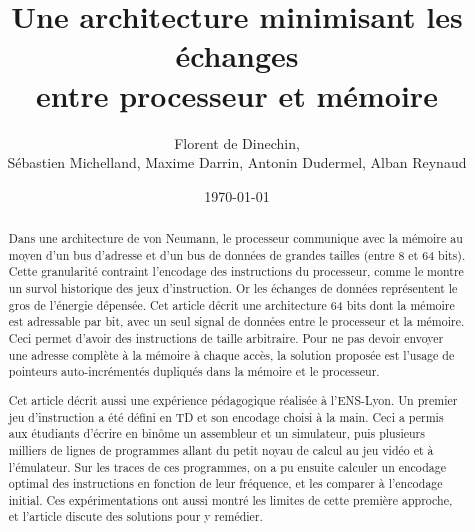 \documentclass[architecture]{compas2018}
\begin{document}
\title{Une architecture minimisant les échanges\\ entre processeur et mémoire}

\author{Florent de Dinechin, \\Sébastien Michelland, Maxime Darrin, Antonin Dudermel, Alban Reynaud}

\address{
}

\date{\today}

\maketitle
\sloppy

\begin{abstract}
Dans une architecture de von Neumann, le processeur communique avec la mémoire au moyen d'un bus d'adresse et d'un bus de données de grandes tailles (entre 8 et 64 bits).
Cette granularité contraint l'encodage des instructions du processeur, comme le montre un survol historique des jeux d'instruction.
Or les échanges de données représentent le gros de l'énergie dépensée.
Cet article décrit une architecture 64 bits dont la mémoire est adressable par bit, avec un seul signal de données entre le processeur et la mémoire.
Ceci permet d'avoir des instructions de taille arbitraire.
Pour ne pas devoir envoyer une adresse complète à la mémoire à chaque accès, la solution proposée est l'usage de pointeurs auto-incrémentés dupliqués dans la mémoire et le processeur.

Cet article décrit aussi une expérience pédagogique réalisée à l'ENS-Lyon.
Un premier jeu d'instruction a été défini en TD et son encodage choisi à la main.
Ceci a permis aux étudiants d'écrire en binôme un assembleur et un simulateur, puis plusieurs milliers de lignes de programmes allant du petit noyau de calcul au jeu vidéo et à l'émulateur.
Sur les traces de ces programmes, on a pu ensuite calculer un encodage optimal des instructions en fonction de leur fréquence, et les comparer à l'encodage initial.
 Ces expérimentations ont aussi montré les limites de cette première approche, et l'article discute  des solutions pour y remédier.
\end{abstract}

\end{document}
